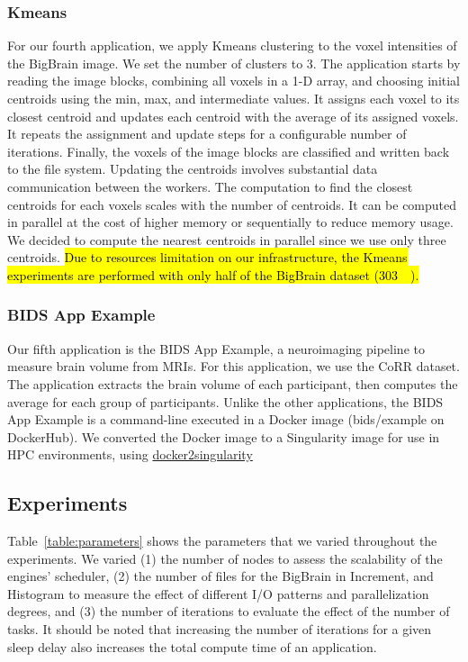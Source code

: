 \documentclass[AMA,STIX1COL]{WileyNJD-v2}
\newcommand{\HL}[1]{\hl{#1}}
\begin{document}
\subsubsection{Kmeans}
For our fourth application, we apply Kmeans clustering to the voxel
intensities of the BigBrain image. We set the number of clusters to 3. The
application starts by reading the image blocks, combining all voxels in a
1-D array, and choosing initial centroids using the min, max, and
intermediate values. It assigns each voxel to its closest centroid and
updates each centroid with the average of its assigned voxels. It repeats
the assignment and update steps for a configurable number of iterations.
Finally, the voxels of the image blocks are classified and written back to
the file system. Updating the centroids involves substantial data
communication between the workers.
The computation to find the closest centroids for each voxels scales with the number of centroids.
It can be computed in parallel at the cost of higher memory or sequentially to reduce memory usage.
We decided to compute the nearest centroids in parallel since we use only three centroids.
\HL{Due to resources limitation on our infrastructure, the Kmeans experiments
	are performed with only half of the BigBrain dataset ({\SI{303}{\gibi\byte}}).}
				
\subsubsection{BIDS App Example}
Our fifth application is the BIDS App Example, a neuroimaging pipeline to
measure brain volume from MRIs. For this application, we use the CoRR
dataset. The application extracts the brain volume of each participant,
then computes the average for each group of participants. Unlike the other
applications, the BIDS App Example is a command-line executed in a Docker image
(bids/example on DockerHub). We converted the Docker image to a Singularity
image for use in HPC environments, using
\href{https://hub.docker.com/r/singularityware/docker2singularity/tags/}{docker2singularity}
						
\subsection{Experiments}
Table~\ref{table:parameters} shows the parameters that we varied
throughout the experiments. We varied (1) the number of nodes to assess
the scalability of the engines' scheduler, (2) the number of files for the BigBrain
in Increment, and Histogram to measure the
effect of different I/O patterns and parallelization degrees, and (3) the
number of iterations to evaluate the effect of the number of tasks.
It should be noted that increasing the number of iterations for a given sleep 
delay also increases the total compute time of an application.
						
\end{document}
